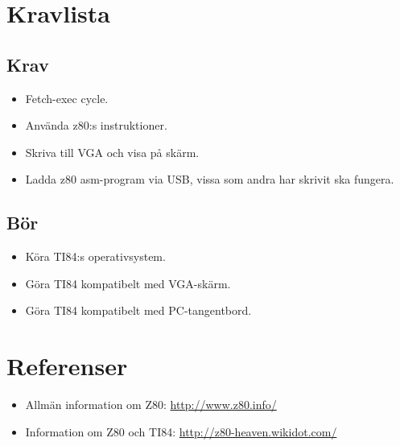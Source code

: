 \documentclass[12pt]{article}
\begin{document}
\section{Kravlista}
\subsection{Krav}
\begin{itemize}
    \item Fetch-exec cycle.
    \item Använda z80:s instruktioner.
    \item Skriva till VGA och visa på skärm.
    \item Ladda z80 asm-program via USB, vissa som andra har skrivit ska
        fungera.
\end{itemize}

\subsection{Bör}
\begin{itemize}
    \item Köra  TI84:s operativsystem.
    \item Göra  TI84 kompatibelt med VGA-skärm.
    \item Göra  TI84 kompatibelt med PC-tangentbord.
\end{itemize}

\section{Referenser}
\begin{itemize}
    \item Allmän information om Z80: \url{http://www.z80.info/}
    \item Information om Z80 och TI84: \url{http://z80-heaven.wikidot.com/}
\end{itemize}
\end{document}
